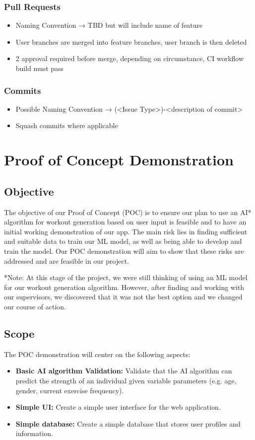 \documentclass{article}
\begin{document}
	\subsubsection{Pull Requests}
	\begin{itemize}
		\item Naming Convention → TBD but will include name of feature
		\item User branches are merged into feature branches, user branch is then deleted
		\item 2 approval required before merge, depending on circumstance, CI workflow build must pass
	\end{itemize}

	\subsubsection{Commits}
	\begin{itemize}
		\item Possible Naming Convention → (\textless Issue Type\textgreater)-\textless description of commit\textgreater
		\item Squash commits where applicable
	\end{itemize}

	\section{Proof of Concept Demonstration}

	\subsection{Objective}
	The objective of our Proof of Concept (POC) is to ensure our plan to use an AI* algorithm for workout generation based on user input is feasible and to have an initial working demonstration of our app. The main risk lies in finding sufficient and suitable data to train our ML model, as well as being able to develop and train the model. Our POC demonstration will aim to show that these risks are addressed and are feasible in our project.

    *Note: At this stage of the project, we were still thinking of using an ML model for our workout generation algorithm. However, after finding and working with our supervisors, we discovered that it was not the best option and we changed our course of action.

	\subsection{Scope}
	The POC demonstration will center on the following aspects:
	\begin{itemize}
		\item \textbf{Basic AI algorithm Validation:} Validate that the AI algorithm can predict the strength of an individual given variable parameters (e.g. age, gender, current exercise frequency).
		\item \textbf{Simple UI:} Create a simple user interface for the web application.
		\item \textbf{Simple database:} Create a simple database that stores user profiles and information.
	\end{itemize}
\end{document}
